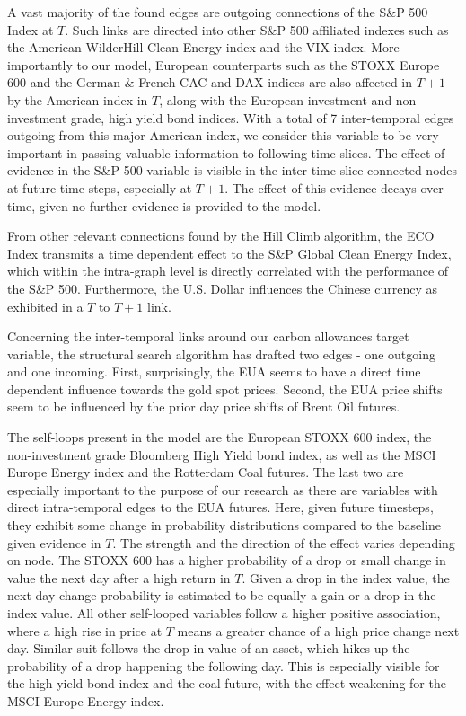 \documentclass[12pt, letterpaper]{article}
\begin{document}
A vast majority of the found edges are outgoing connections of the S\&P 500 Index at $T$. Such links are directed into other S\&P 500 affiliated indexes such as the American WilderHill Clean Energy index and the VIX index. More importantly to our model, European counterparts such as the STOXX Europe 600 and the German \& French CAC and DAX indices are also affected in $T+1$ by the American index in $T$, along with the European investment and non-investment grade, high yield bond indices. With a total of 7 inter-temporal edges outgoing from this major American index, we consider this variable to be very important in passing valuable information to following time slices. The effect of evidence in the S\&P 500 variable is visible in the inter-time slice connected nodes at future time steps, especially at $T+1$. The effect of this evidence decays over time, given no further evidence is provided to the model.

From other relevant connections found by the Hill Climb algorithm, the ECO Index transmits a time dependent effect to the S\&P Global Clean Energy Index, which within the intra-graph level is directly correlated with the performance of the S\&P 500. Furthermore, the U.S. Dollar influences the Chinese currency as exhibited in a $T$ to $T+1$ link.

Concerning the inter-temporal links around our carbon allowances target variable, the structural search algorithm has drafted two edges - one outgoing and one incoming. First, surprisingly, the EUA seems to have a direct time dependent influence towards the gold spot prices. Second, the EUA price shifts seem to be influenced by the prior day price shifts of Brent Oil futures.

The self-loops present in the model are the European STOXX 600 index, the non-investment grade Bloomberg High Yield bond index, as well as the MSCI Europe Energy index and the Rotterdam Coal futures. The last two are especially important to the purpose of our research as there are variables with direct intra-temporal edges to the EUA futures. Here, given future timesteps, they exhibit some change in probability distributions compared to the baseline given evidence in $T$. The strength and the direction of the effect varies depending on node. The STOXX 600 has a higher probability of a drop or small change in value the next day after a high return in $T$. Given a drop in the index value, the next day change probability is estimated to be equally a gain or a drop in the index value. All other self-looped variables follow a higher positive association, where a high rise in price at $T$ means a greater chance of a high price change next day. Similar suit follows the drop in value of an asset, which hikes up the probability of a drop happening the following day. This is especially visible for the high yield bond index and the coal future, with the effect weakening for the MSCI Europe Energy index.
\end{document}
